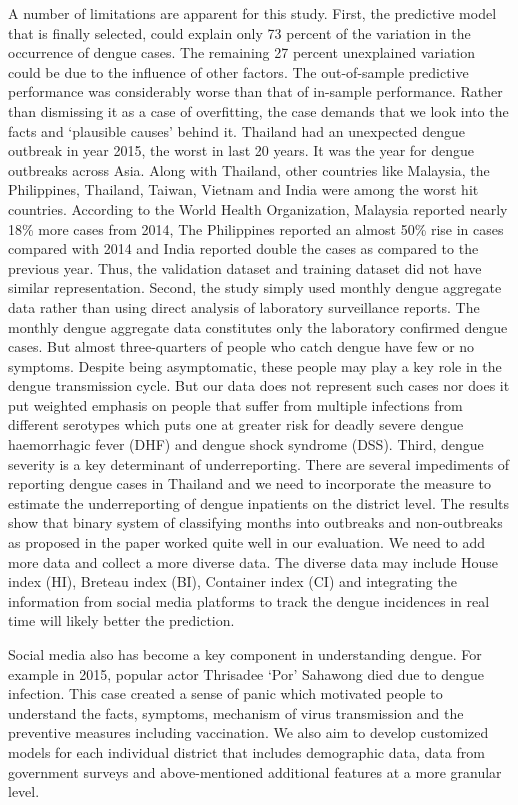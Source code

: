 \documentclass{bmcart}
\begin{document}
A number of limitations are apparent for this study. First, the predictive model that is finally selected, could explain only 73 percent of the variation in the occurrence of dengue cases. The remaining 27 percent unexplained variation could be due to the influence of other factors. The out-of-sample predictive performance was considerably worse than that of in-sample performance. Rather than dismissing it as a case of overfitting, the case demands that we look into the facts and `plausible causes' behind it. Thailand had an unexpected dengue outbreak in year 2015, the worst in last 20 years. It was the year for dengue outbreaks across Asia. Along with Thailand, other countries like Malaysia, the Philippines, Thailand, Taiwan, Vietnam and India were among the worst hit countries. According to the World Health Organization, Malaysia reported nearly 18\% more cases from 2014, The Philippines reported an almost 50\% rise in cases compared with 2014 and India reported double the cases as compared to the previous year. Thus, the validation dataset and training dataset did not have similar representation. Second, the study simply used monthly dengue aggregate data rather than using direct analysis of laboratory surveillance reports. The monthly dengue aggregate data constitutes only the laboratory confirmed dengue cases. But almost three-quarters of people who catch dengue have few or no symptoms. Despite being asymptomatic, these people may play a key role in the dengue transmission cycle. But our data does not represent such cases nor does it put weighted emphasis on people that suffer from multiple infections from different serotypes which puts one at greater risk for deadly severe dengue haemorrhagic fever (DHF) and dengue shock syndrome (DSS).  Third, dengue severity is a key determinant of underreporting. There are several impediments of reporting dengue cases in Thailand and we need to incorporate the measure to estimate the underreporting of dengue inpatients on the district level. The results show that binary system of classifying months into outbreaks and non-outbreaks as proposed in the paper worked quite well in our evaluation. We need to add more data and collect a more diverse data. The diverse data may include House index (HI), Breteau index (BI), Container index (CI) and integrating the information from social media platforms to track the dengue incidences in real time will likely better the prediction.
	
Social media also has become a key component in understanding dengue. For example in 2015, popular actor Thrisadee `Por' Sahawong died due to dengue infection. This case created a sense of panic which motivated people to understand the facts, symptoms, mechanism of virus transmission  and the preventive measures including vaccination.	
We also aim to develop customized models for each individual district that includes demographic data, data from government surveys and above-mentioned additional features at a more granular level. 
\end{document}
